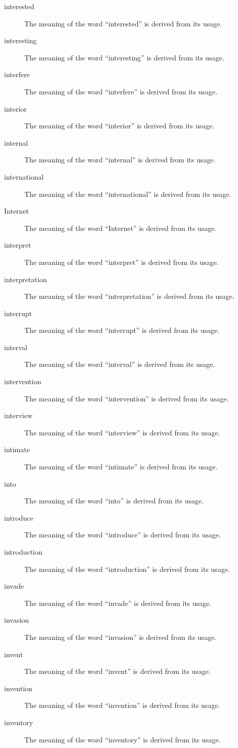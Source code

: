 \documentclass[12pt, letterpaper]{memoir}
\begin{document}
\begin{description}
\item[interested] The meaning of the word ``interested'' is derived from its usage.
\item[interesting] The meaning of the word ``interesting'' is derived from its usage.
\item[interfere] The meaning of the word ``interfere'' is derived from its usage.
\item[interior] The meaning of the word ``interior'' is derived from its usage.
\item[internal] The meaning of the word ``internal'' is derived from its usage.
\item[international] The meaning of the word ``international'' is derived from its usage.
\item[Internet] The meaning of the word ``Internet'' is derived from its usage.
\item[interpret] The meaning of the word ``interpret'' is derived from its usage.
\item[interpretation] The meaning of the word ``interpretation'' is derived from its usage.
\item[interrupt] The meaning of the word ``interrupt'' is derived from its usage.
\item[interval] The meaning of the word ``interval'' is derived from its usage.
\item[intervention] The meaning of the word ``intervention'' is derived from its usage.
\item[interview] The meaning of the word ``interview'' is derived from its usage.
\item[intimate] The meaning of the word ``intimate'' is derived from its usage.
\item[into] The meaning of the word ``into'' is derived from its usage.
\item[introduce] The meaning of the word ``introduce'' is derived from its usage.
\item[introduction] The meaning of the word ``introduction'' is derived from its usage.
\item[invade] The meaning of the word ``invade'' is derived from its usage.
\item[invasion] The meaning of the word ``invasion'' is derived from its usage.
\item[invent] The meaning of the word ``invent'' is derived from its usage.
\item[invention] The meaning of the word ``invention'' is derived from its usage.
\item[inventory] The meaning of the word ``inventory'' is derived from its usage.

\end{description}
\end{document}
